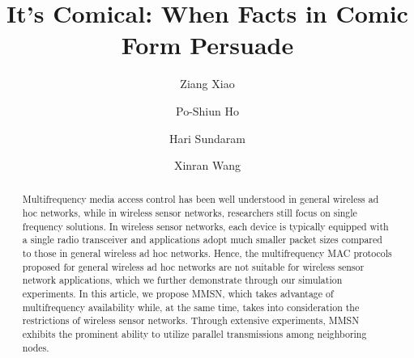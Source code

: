 \documentclass[format=acmsmall, natbib=false, review=false, anonymous=true, screen=true]{acmart}
\begin{document}
\title[Persuasion in Comic form]{It's Comical: When Facts in Comic Form Persuade}


\author{Ziang Xiao}
\author{Po-Shiun Ho}
\author{Hari Sundaram}
\author{Xinran Wang}




\begin{abstract}
 Multifrequency media access control has been well understood in
 general wireless ad hoc networks, while in wireless sensor networks,
 researchers still focus on single frequency solutions. In wireless
 sensor networks, each device is typically equipped with a single
 radio transceiver and applications adopt much smaller packet sizes
 compared to those in general wireless ad hoc networks. Hence, the
 multifrequency MAC protocols proposed for general wireless ad hoc
 networks are not suitable for wireless sensor network applications,
 which we further demonstrate through our simulation experiments. In
 this article, we propose MMSN, which takes advantage of
 multifrequency availability while, at the same time, takes into
 consideration the restrictions of wireless sensor networks. Through
 extensive experiments, MMSN exhibits the prominent ability to utilize
 parallel transmissions among neighboring nodes.
\end{abstract}


%
%
%
\end{document}
